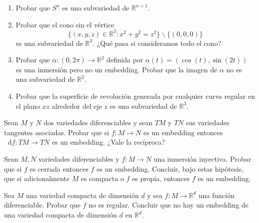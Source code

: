 \documentclass[12pt, a4paper]{amsart}
\theoremstyle{definition}
\newcommand{\RR}{\mathbb{R}}      %
\newcommand*\diff{\mathop{}\!\mathrm{d}}
\begin{document}
\begin{question}\vspace{-1.5em}\begin{enumerate}[label=\textbf{\alph*.}]
\item Probar que $S^n$ es una subvariedad de $\RR^{n+1}$.

\item Probar que el cono sin el vértice $$\{(x,y,z)\in\RR^3:x^2+y^2=z^2\}\smallsetminus\{(0,0,0)\}$$ es una subvariedad de $\RR^3$. ¿Qué pasa si consideramos todo el cono?

\item Probar que $\alpha:(0,2\pi)\to\RR^2$ definida por $\alpha(t)=(\cos(t),\sin(2t))$ es una inmersión pero no un embedding. Probar que la imagen de $\alpha$ no es una subvariedad de $\RR^2$.

\item Probar que la superficie de revolución generada por cualquier curva regular en el plano $xz$ alrededor del eje $z$ es una subvariedad de $\RR^3$.
\end{enumerate}
\end{question}

\begin{question}
Sean $M$ y $N$ dos variedades diferenciables y sean $TM$ y $TN$ sus variedades tangentes asociadas. Probar que si $f:M\to N$ es un embedding
entonces $\diff f:TM\to TN$ es un embedding. ¿Vale la recíproca?
\end{question}

\begin{question}
Sean $M,N$ variedades diferenciables y $f:M\to N$ una inmersión inyectiva. Probar que si $f$ es cerrada entonces $f$ es un embedding. Concluir, bajo estas hipótesis, que si adicionalmente $M$ es compacta o $f$ es propia, entonces $f$ es un embedding.
\end{question}

\begin{question}
Sea $M$ una variedad compacta de dimensión $d$ y sea $f:M\to\RR^d$ una función diferenciable. Probar que $f$ no es regular. Concluir que no hay un embedding de una variedad compacta de dimensión $d$ en $\RR^d$.
\end{question}
\end{document}
